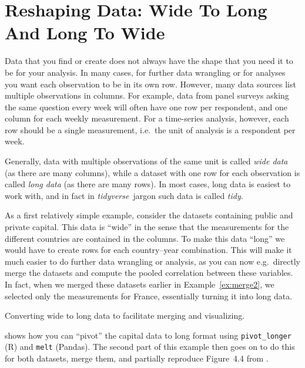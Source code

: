 \section{Reshaping Data: Wide To Long And Long To Wide}\label{sec:pivot}

Data that you find or create does not always have the shape that you need it to be  for your analysis.
In many cases, for further data wrangling or for analyses you want each observation to be in its own row.
However, many data sources list multiple observations in columns.
For example, data from panel surveys asking the same question every week will often have one row per respondent,
and one column for each weekly measurement.
For a time-series analysis, however, each row should be a single measurement,
i.e.\ the unit of analysis is a respondent per week.

Generally, data with multiple observations of the same unit is called \emph{wide data} (as there are many columns),
while a dataset with one row for each observation is called \emph{long data} (as there are many rows).
In most cases, long data is easiest to work with, and in fact in \emph{tidyverse}\ jargon such data is called \emph{tidy}.

As a first relatively simple example, consider the datasets containing public and private capital.
This data is ``wide'' in the sense that the measurements for the different countries are contained in the columns.
To make this data ``long'' we would have to create rows for each country--year combination.
This will make it much easier to do further data wrangling or analysis, as you can now e.g.\ directly merge the datasets and compute the pooled correlation between these variables.
In fact, when we merged these datasets earlier in Example~\ref{ex:merge2}, we selected only the measurements for France, essentially turning it into long data.

\begin{ccsexample}
  \begin{tcolorbox}[title=Output]
    \texttt{[image: \{snippets/chapter06/merge2.r]}.png}
  \end{tcolorbox}
  \caption{Converting wide to long data to facilitate merging and visualizing.}\label{ex:merge2}
\end{ccsexample}

 shows how you can ``pivot'' the capital data to long format using \texttt{pivot\_longer} (R) and \texttt{melt} (Pandas). The second part of this example then goes on to do this for both datasets, merge them, and partially reproduce Figure~4.4 from \citet{piketty}.

